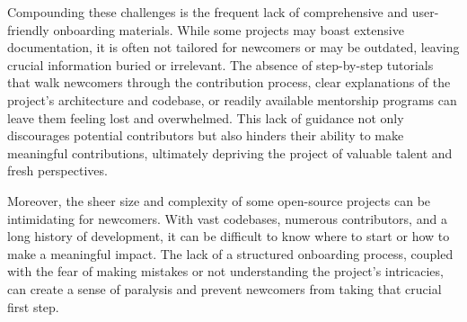Compounding these challenges is the frequent lack of comprehensive and user-friendly onboarding materials. While some projects may boast extensive documentation, it is often not tailored for newcomers or may be outdated, leaving crucial information buried or irrelevant. The absence of step-by-step tutorials that walk newcomers through the contribution process, clear explanations of the project's architecture and codebase, or readily available mentorship programs can leave them feeling lost and overwhelmed. This lack of guidance not only discourages potential contributors but also hinders their ability to make meaningful contributions, ultimately depriving the project of valuable talent and fresh perspectives.

Moreover, the sheer size and complexity of some open-source projects can be intimidating for newcomers. With vast codebases, numerous contributors, and a long history of development, it can be difficult to know where to start or how to make a meaningful impact. The lack of a structured onboarding process, coupled with the fear of making mistakes or not understanding the project's intricacies, can create a sense of paralysis and prevent newcomers from taking that crucial first step.








\clearpage